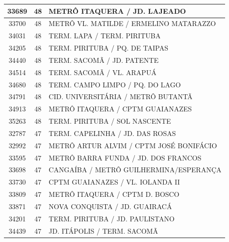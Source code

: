 \documentclass[
	12pt,				%
	oneside,			%
	a4paper,			%
	english,			%
	brazil				%
	]{abntex2ppgsi}
\begin{document}
{{\begin{apendicesenv}
\begin{longtable}{c|c|p{7cm}}
    33689 & 48    & METRÔ ITAQUERA / JD. LAJEADO \\
\hline

    33700 & 48    & METRÔ VL. MATILDE / ERMELINO MATARAZZO \\
\hline

    34031 & 48    & TERM. LAPA / TERM. PIRITUBA \\
\hline

    34205 & 48    & TERM. PIRITUBA / PQ. DE TAIPAS \\
\hline

    34440 & 48    & TERM. SACOMÃ / JD. PATENTE \\
\hline

    34514 & 48    & TERM. SACOMÃ / VL. ARAPUÁ \\
\hline

    34680 & 48    & TERM. CAMPO LIMPO / PQ. DO LAGO \\
\hline

    34791 & 48    & CID. UNIVERSITÁRIA / METRÔ BUTANTÃ \\
\hline

    34913 & 48    & METRÔ ITAQUERA / CPTM GUAIANAZES \\
\hline

    35263 & 48    & TERM. PIRITUBA / SOL NASCENTE \\
\hline

    32787 & 47    & TERM. CAPELINHA / JD. DAS ROSAS \\
\hline

    32992 & 47    & METRÔ ARTUR ALVIM / CPTM JOSÉ BONIFÁCIO \\
\hline

    33595 & 47    & METRÔ BARRA FUNDA / JD. DOS FRANCOS \\
\hline

    33698 & 47    & CANGAÍBA / METRÔ GUILHERMINA/ESPERANÇA \\
\hline

    33730 & 47    & CPTM GUAIANAZES / VL. IOLANDA II \\
\hline

    33809 & 47    & METRÔ ITAQUERA / CPTM D. BOSCO \\
\hline

    33871 & 47    & NOVA CONQUISTA / JD. GUAIRACÁ \\
\hline

    34201 & 47    & TERM. PIRITUBA / JD. PAULISTANO \\
\hline

    34439 & 47    & JD. ITÁPOLIS / TERM. SACOMÃ \\
\hline


\end{longtable}
\end{apendicesenv}}}
\end{document}
